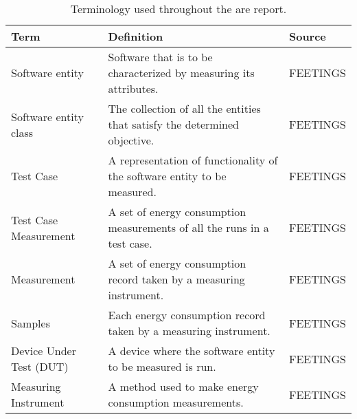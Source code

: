 \begin{table}[]
    \begin{tabular}{lll}
    \hline
    \multicolumn{1}{|l}{Term} & Definition                                                                & \multicolumn{1}{l|}{Source} \\ \hline
    Software entity           & Software that is to be characterized by measuring its attributes.         & FEETINGS                    \\ \hline
    Software entity class     & The collection of all the entities that satisfy the determined objective. & FEETINGS                    \\ \hline
    Test Case                 & A representation of functionality of the software entity to be measured.  & FEETINGS                    \\ \hline
    Test Case Measurement      & A set of energy consumption measurements of all the runs in a test case.  & FEETINGS                    \\ \hline
    Measurement               & A set of energy consumption record taken by a measuring instrument.       & FEETINGS                    \\ \hline
    Samples                   & Each energy consumption record taken by a measuring instrument.           & FEETINGS                    \\ \hline
    Device Under Test (DUT)   & A device where the software entity to be measured is run.                 & FEETINGS                    \\ \hline
    Measuring Instrument      & A method used to make energy consumption measurements.                    & FEETINGS                    \\ \hline
    \end{tabular}
    \caption{Terminology used throughout the are report.}
    \label{tab:feetTable}
    \end{table}